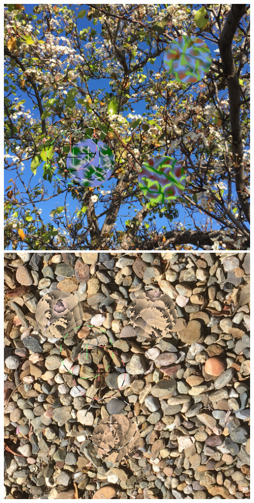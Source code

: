 \documentclass[acmtog]{acmart}
\begin{document}
\begin{teaserfigure}
    \includegraphics[scale=0.24]{images/20220926_step_6143.png}
    \hfill
    \includegraphics[scale=0.24]{images/20221003_step_3667.png}
    \hfill

\end{teaserfigure}
\end{document}
